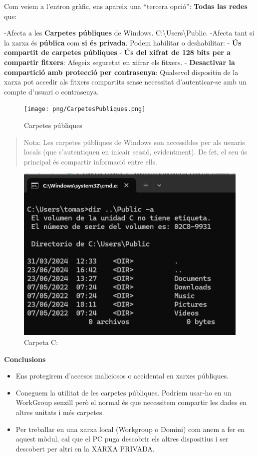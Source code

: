 \documentclass[
  a4paper,
]{article}
\providecommand{\tightlist}{%
  \setlength{\itemsep}{0pt}\setlength{\parskip}{0pt}}
\begin{document}
Com veiem a l'entron gràfic, ens apareix una ``tercera opció'':
\textbf{Todas las redes} que:

-Afecta a les \textbf{Carpetes públiques} de Windows.
C:\textbackslash Users\textbackslash Public. -Afecta tant si la xarxa és
\textbf{pública} com \textbf{si és privada}. Podem habilitar o
deshabilitar: - \textbf{Ús compartit de carpetes públiques} - \textbf{Ús
del xifrat de 128 bits per a compartir fitxers}: Afegeix seguretat en
xifrar els fitxers. - \textbf{Desactivar la compartició amb protecció
per contrasenya}: Qualsevol dispositiu de la xarxa pot accedir als
fitxers compartits sense necessitat d'autenticar-se amb un compte
d'usuari o contrasenya.

\begin{figure}
\centering
\texttt{[image: png/CarpetesPubliques.png]}
\caption{Carpetes públiques}
\end{figure}

\begin{quote}
Nota: Les carpetes públiques de Windows son accessibles per als usuaris
locals (que s'autentiquen en inicair sessió, evidentment). De fet, el
seu ús principal és compartir informació entre ells.
\end{quote}

\begin{figure}
\centering
\includegraphics{png/CarpetaPublic.png}
\caption{Carpeta C:\users\Public}
\end{figure}

\textbf{Conclusions}

\begin{itemize}
\tightlist
\item
  Ens protegirem d'accesos maliciosos o accidental en xarxes públiques.
\item
  Coneguem la utilitat de les carpetes públiques. Podríem usar-ho en un
  WorkGroup senzill però el normal és que necessitem compartir les dades
  en altres unitats i més carpetes.
\item
  Per treballar en una xarxa local (Workgroup o Domini) com anem a fer
  en aquest mòdul, cal que el PC puga descobrir els altres dispositius i
  ser descobert per altri en la XARXA PRIVADA.
\end{itemize}
\end{document}

